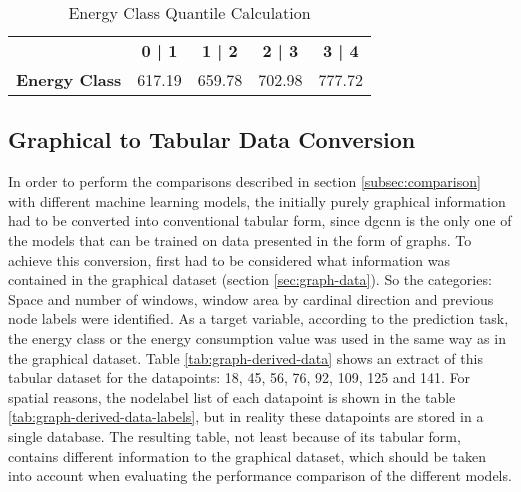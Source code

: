 \documentclass[a4paper, 12pt]{report}
\begin{document}
\begin{table}
\centering
\begin{tabular}{ ccccc }
& \textbf{0 | 1} & \textbf{1 | 2} & \textbf{2 | 3} & \textbf{3 | 4} \\
\textbf{Energy Class} & 617.19 & 659.78 & 702.98 & 777.72 \\
\end{tabular}
\caption{Energy Class Quantile Calculation}
\label{tab:energy-class-calculation-quantiles}
\end{table}

\subsection{Graphical to Tabular Data Conversion}\label{subsec:graphical-to-tabular-data-conversion}

In order to perform the comparisons described in section \ref{subsec:comparison} with different machine learning models, the initially purely graphical information had to be converted into conventional tabular form, since \acrshort{dgcnn} is the only one of the models that can be trained on data presented in the form of graphs. To achieve this conversion, first had to be considered what information was contained in the graphical dataset (section \ref{sec:graph-data}). So the categories: Space and number of windows, window area by cardinal direction and previous node labels were identified. As a target variable, according to the prediction task, the energy class or the energy consumption value was used in the same way as in the graphical dataset. Table \ref{tab:graph-derived-data} shows an extract of this tabular dataset for the datapoints: 18, 45, 56, 76, 92, 109, 125 and 141. For spatial reasons, the nodelabel list of each datapoint is shown in the table \ref{tab:graph-derived-data-labels}, but in reality these datapoints are stored in a single database. The resulting table, not least because of its tabular form, contains different information to the graphical dataset, which should be taken into account when evaluating the performance comparison of the different models.
\end{document}

